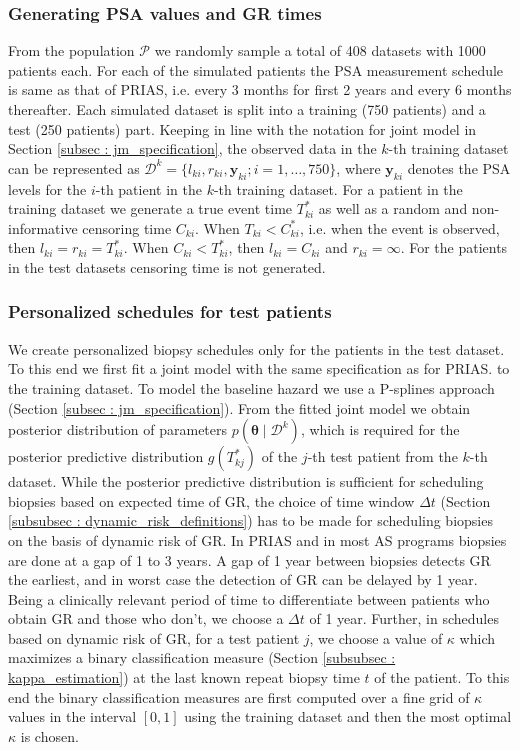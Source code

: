 \subsubsection{Generating PSA values and GR times}
From the population $\mathcal{P}$ we randomly sample a total of 408 datasets with 1000 patients each. For each of the simulated patients the PSA measurement schedule is same as that of PRIAS, i.e. every 3 months for first 2 years and every 6 months thereafter. Each simulated dataset is split into a training (750 patients) and a test (250 patients) part. Keeping in line with the notation for joint model in Section \ref{subsec : jm_specification}, the observed data in the $k$-th training dataset can be represented as $\mathcal{D}^k = \{l_{ki}, r_{ki}, \boldsymbol{y}_{ki}; i = 1, \ldots, 750\}$, where $\boldsymbol{y}_{ki}$ denotes the PSA levels for the $i$-th patient in the $k$-th training dataset. For a patient in the training dataset we generate a true event time $T^*_{ki}$ as well as a random and non-informative censoring time $C_{ki}$. When $T_{ki} < C^*_{ki}$, i.e. when the event is observed, then $l_{ki} = r_{ki} = T^*_{ki}$. When $C_{ki} < T^*_{ki}$, then $l_{ki} = C_{ki}$ and $r_{ki} = \infty$. For the patients in the test datasets censoring time is not generated. 

\subsubsection{Personalized schedules for test patients}
\label{subsubsec : sim_study_pers_sched_details}
We create personalized biopsy schedules only for the patients in the test dataset. To this end we first fit a joint model with the same specification as for PRIAS. to the training dataset. To model the baseline hazard we use a P-splines approach (Section \ref{subsec : jm_specification}). From the fitted joint model we obtain posterior distribution of parameters $p(\boldsymbol{\theta} \mid \mathcal{D}^k)$, which is required for the posterior predictive distribution $g(T^*_{kj})$ of the $j$-th test patient from the $k$-th dataset. While the posterior predictive distribution is sufficient for scheduling biopsies based on expected time of GR, the choice of time window $\Delta t$ (Section \ref{subsubsec : dynamic_risk_definitions}) has to be made for scheduling biopsies on the basis of dynamic risk of GR. In PRIAS and in most AS programs biopsies are done at a gap of 1 to 3 years. A gap of 1 year between biopsies detects GR the earliest, and in worst case the detection of GR can be delayed by 1 year. Being a clinically relevant period of time to differentiate between patients who obtain GR and those who don't, we choose a $\Delta t$ of 1 year. Further, in schedules based on dynamic risk of GR, for a test patient $j$, we choose a value of $\kappa$ which maximizes a binary classification measure (Section \ref{subsubsec : kappa_estimation}) at the last known repeat biopsy time $t$ of the patient. To this end the binary classification measures are first computed over a fine grid of $\kappa$ values in the interval $[0,1]$ using the training dataset and then the most optimal $\kappa$ is chosen.\\

